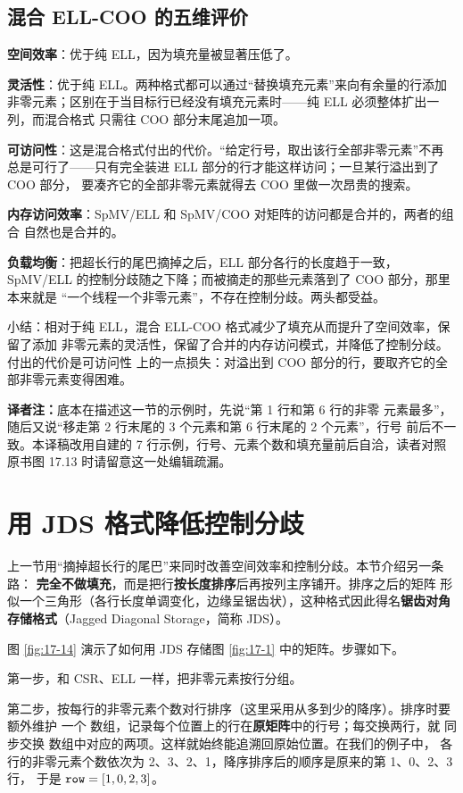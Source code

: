 \subsection*{混合 ELL-COO 的五维评价}

\textbf{空间效率}：优于纯 ELL，因为填充量被显著压低了。

\textbf{灵活性}：优于纯 ELL。两种格式都可以通过“替换填充元素”来向有余量的行添加
非零元素；区别在于当目标行已经没有填充元素时——纯 ELL 必须整体扩出一列，而混合格式
只需往 COO 部分末尾追加一项。

\textbf{可访问性}：这是混合格式付出的代价。“给定行号，取出该行全部非零元素”不再
总是可行了——只有完全装进 ELL 部分的行才能这样访问；一旦某行溢出到了 COO 部分，
要凑齐它的全部非零元素就得去 COO 里做一次昂贵的搜索。

\textbf{内存访问效率}：SpMV/ELL 和 SpMV/COO 对矩阵的访问都是合并的，两者的组合
自然也是合并的。

\textbf{负载均衡}：把超长行的尾巴摘掉之后，ELL 部分各行的长度趋于一致，
SpMV/ELL 的控制分歧随之下降；而被摘走的那些元素落到了 COO 部分，那里本来就是
“一个线程一个非零元素”，不存在控制分歧。两头都受益。

小结：相对于纯 ELL，混合 ELL-COO 格式减少了填充从而提升了空间效率，保留了添加
非零元素的灵活性，保留了合并的内存访问模式，并降低了控制分歧。付出的代价是可访问性
上的一点损失：对溢出到 COO 部分的行，要取齐它的全部非零元素变得困难。

\noindent\textbf{译者注：}底本在描述这一节的示例时，先说“第 1 行和第 6 行的非零
元素最多”，随后又说“移走第 2 行末尾的 3 个元素和第 6 行末尾的 2 个元素”，行号
前后不一致。本译稿改用自建的 7 行示例，行号、元素个数和填充量前后自洽，读者对照
原书图 17.13 时请留意这一处编辑疏漏。

\section{用 JDS 格式降低控制分歧}
\label{sec:spmv-jds}

上一节用“摘掉超长行的尾巴”来同时改善空间效率和控制分歧。本节介绍另一条路：
\textbf{完全不做填充}，而是把行\textbf{按长度排序}后再按列主序铺开。排序之后的矩阵
形似一个三角形（各行长度单调变化，边缘呈锯齿状），这种格式因此得名\textbf{锯齿对角
存储格式}（Jagged Diagonal Storage，简称 JDS）。

图 \ref{fig:17-14} 演示了如何用 JDS 存储图 \ref{fig:17-1} 中的矩阵。步骤如下。

第一步，和 CSR、ELL 一样，把非零元素按行分组。

第二步，按每行的非零元素个数对行排序（这里采用从多到少的降序）。排序时要额外维护
一个  数组，记录每个位置上的行在\textbf{原矩阵}中的行号；每交换两行，就
同步交换  数组中对应的两项。这样就始终能追溯回原始位置。在我们的例子中，
各行的非零元素个数依次为 2、3、2、1，降序排序后的顺序是原来的第 1、0、2、3 行，
于是 $\code{row}=[1,0,2,3]$。


